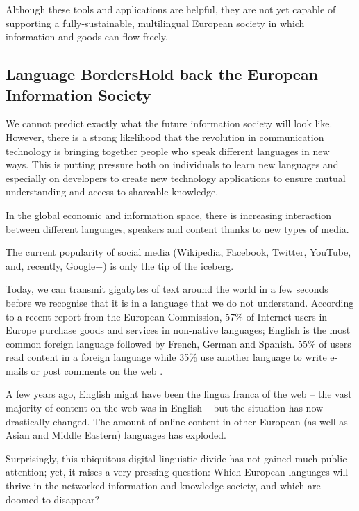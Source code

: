 \begin{multicols}{2}
Although these tools and applications are helpful, they are not yet capable of supporting a fully-sustainable, multilingual European society in which information and goods can flow freely.

\subsection[Language Borders Hold back the European Information Society]{Language Borders\newline Hold back the European Information Society}

We cannot predict exactly what the future information society will look like. However, there is a strong likelihood that the revolution in communication technology is bringing together people who speak different languages in new ways. This is putting pressure both on individuals to learn new languages and especially on developers to create new technology applications to ensure mutual understanding and access to shareable knowledge. 

In the global economic and information space, there is increasing interaction between different languages, speakers and content thanks to new types of media. 

The current popularity of social media (Wikipedia, Facebook, Twitter, YouTube, and, recently, Google+) is only the tip of the iceberg.


Today, we can transmit gigabytes of text around the world in a few seconds before we recognise that it is in a language that we do not understand. According to a recent report from the European Commission, 57\% of Internet users in Europe purchase goods and services in non-native languages; English is the most common foreign language followed by French, German and Spanish. 55\% of users read content in a foreign language while 35\% use another language to write e-mails or post comments on the web \cite{EC1}. 

A few years ago, English might have been the lingua franca of the web -- the vast majority of content on the web was in English -- but the situation has now drastically changed. The amount of online content in other European (as well as Asian and Middle Eastern) languages has exploded.

Surprisingly, this ubiquitous digital linguistic divide has not gained much public attention; yet, it raises a very pressing question: Which European languages will thrive in the networked information and knowledge society, and which are doomed to disappear?


\end{multicols}
